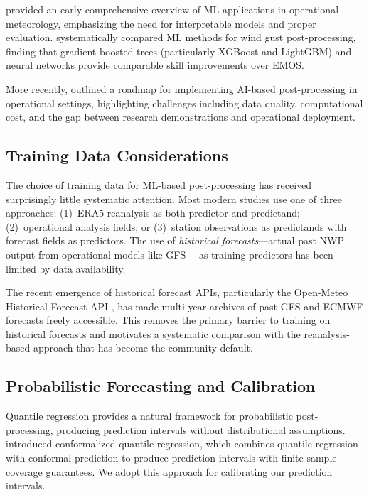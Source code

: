 \documentclass[12pt, letterpaper]{article}
\begin{document}
\citet{mcgovern2017using} provided an early comprehensive overview of ML
applications in operational meteorology, emphasizing the need for interpretable
models and proper evaluation. \mbox{\citet{schulz2022machine}} systematically compared
ML methods for wind gust post-processing, finding that gradient-boosted trees
(particularly XGBoost and LightGBM) and neural networks provide comparable
skill improvements over EMOS.

More recently, \citet{haupt2021first} outlined a roadmap for implementing AI-based
post-processing in operational settings, highlighting challenges including data
quality, computational cost, and the gap between research demonstrations and
operational deployment.

\subsection{Training Data Considerations}

The choice of training data for ML-based post-processing has received surprisingly
little systematic attention. Most modern studies use one of three approaches:
(1)~ERA5 reanalysis \citep{hersbach2020era5} as both predictor and predictand;
(2)~operational analysis fields; or (3)~station observations as predictands with
forecast fields as predictors. The use of \emph{historical forecasts}---actual past
NWP output from operational models like GFS \citep{ncep2021gfs}---as training
predictors has been limited by data availability.

The recent emergence of historical forecast APIs, particularly the Open-Meteo
Historical Forecast API \citep{zippenfenig2023openmeteo}, has made multi-year
archives of past GFS and ECMWF forecasts freely accessible. This removes the
primary barrier to training on historical forecasts and motivates a systematic
comparison with the reanalysis-based approach that has become the community default.

\subsection{Probabilistic Forecasting and Calibration}

Quantile regression \citep{koenker1978quantile} provides a natural framework for
probabilistic post-processing, producing prediction intervals without distributional
assumptions. \citet{romano2019conformal} introduced conformalized quantile
regression, which combines quantile regression with conformal prediction
\citep{romano2019conformal} to produce prediction intervals with finite-sample
coverage guarantees. We adopt this approach for calibrating our prediction intervals.
\end{document}
